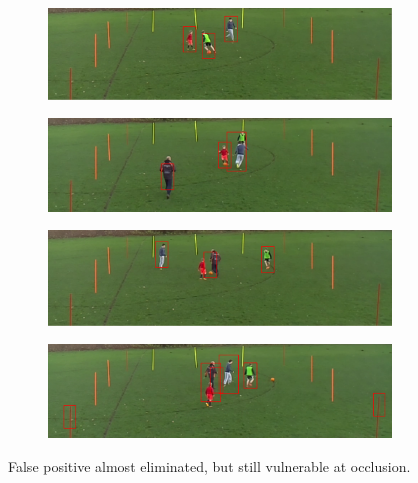 \documentclass{article}
\begin{document}
\begin{figure}[h!]
  \begin{subfigure}[b]{\linewidth}
  \centering
    \includegraphics[scale=0.2]{report/pic/3/selfHOG_2ndround_1.png} 
  \end{subfigure}
  \begin{subfigure}[b]{\linewidth}
  \centering
    \includegraphics[scale=0.2]{report/pic/3/selfHOG_2ndround_2.png} 
  \end{subfigure}
  \begin{subfigure}[b]{\linewidth}
  \centering
    \includegraphics[scale=0.2]{report/pic/3/selfHOG_2ndround_3.png} 
  \end{subfigure}
  \begin{subfigure}[b]{\linewidth}
  \centering
    \includegraphics[scale=0.2]{report/pic/3/selfHOG_2ndround_4.png} 
  \end{subfigure}
  \caption{False positive almost eliminated, but still vulnerable at occlusion.}
\end{figure}
\end{document}
